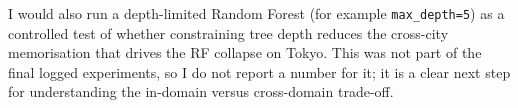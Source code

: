 \documentclass[12pt,a4paper]{article}
\newcommand{\code}[1]{\texttt{#1}}
\begin{document}
I would also run a depth-limited Random Forest (for example \code{max\_depth=5}) as a
controlled test of whether constraining tree depth reduces the cross-city memorisation
that drives the RF collapse on Tokyo. This was not part of the final logged experiments,
so I do not report a number for it; it is a clear next step for understanding the
in-domain versus cross-domain trade-off.



\end{document}
